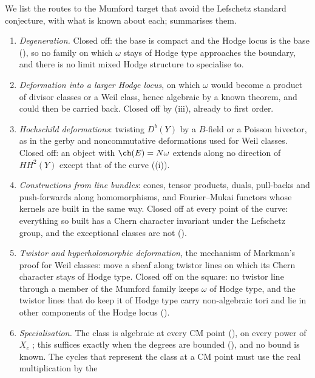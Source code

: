 \begin{remark}\label{rem:bypassaudit}
We list the routes to the Mumford target that avoid the Lefschetz standard
conjecture, with what is known about each;  summarises
them.
\begin{enumerate}[label=\textup{(\arabic*)},leftmargin=2.6em,itemsep=2pt]
\item \emph{Degeneration.} Closed off: the base is compact and the Hodge
  locus is the base (), so no family on which
  $\omega$ stays of Hodge type approaches the boundary, and there is no limit
  mixed Hodge structure to specialise to.
\item \emph{Deformation into a larger Hodge locus}, on which $\omega$ would
  become a product of divisor classes or a Weil class, hence algebraic by a
  known theorem, and could then be carried back. Closed off by
  (iii), already to first order.
\item \emph{Hochschild deformations}: twisting $D^{b}(Y)$ by a $B$-field or a
  Poisson bivector, as in the gerby and noncommutative deformations used for
  Weil classes. Closed off: an object with $\ch(E)=N\omega$ extends along no
  direction of $HH^{2}(Y)$ except that of the curve
  ((i)).
\item \emph{Constructions from line bundles}: cones, tensor products, duals,
  pull-backs and push-forwards along homomorphisms, and Fourier--Mukai
  functors whose kernels are built in the same way. Closed off at every point
  of the curve: everything so built has a Chern character invariant under the
  Lefschetz group, and the exceptional classes are not
  ().
\item \emph{Twistor and hyperholomorphic deformation}, the mechanism of
  Markman's proof for Weil classes: move a sheaf along twistor lines on which
  its Chern character stays of Hodge type. Closed off on the square: no
  twistor line through a member of the Mumford family keeps $\omega$ of Hodge
  type, and the twistor lines that do keep it of Hodge type carry
  non-algebraic tori and lie in other components of the Hodge locus
  ().
\item \emph{Specialisation.} The class is algebraic at every CM point
  (), on every power of $X_{c}$ \cite[Theorem~1.3]{Li26};
  this suffices exactly when the degrees are bounded
  (), and no bound is known. The cycles that
  represent the class at a CM point must use the real multiplication by the

\end{enumerate}
\end{remark}

